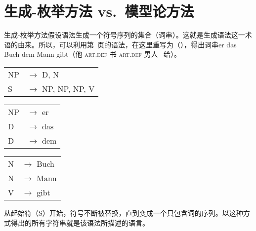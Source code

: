 
\chapter{生成-枚举方法 vs.\ 模型论方法}
\label{Abschnitt-Generativ-Modelltheoretisch}

生成-枚举方法假设语法生成一个符号序列的集合（词串）。这就是生成语法这一术语的由来。所以，可以利用第~\pageref{bsp-grammatik-psg}页的语法，在这里重写为（），得出词串er das Buch dem Mann gibt（他 \textsc{art}.\textsc{def} 书 \textsc{art}.\textsc{def} 男人 \, 给）。
\ea
\label{bsp-grammatik-psg-zwei}
\begin{tabular}[t]{@{}l@{ }l}
{NP} & {$\to$ D, N}\\          
{S}  & {$\to$ NP, NP, NP, V}
\end{tabular}\hspace{2cm}%
\begin{tabular}[t]{@{}l@{ }l}
{NP} & {$\to$ er}\\
{D}  & {$\to$ das}\\
{D}  & {$\to$ dem}\\
\end{tabular}\hspace{8mm}
\begin{tabular}[t]{@{}l@{ }l}
{N} & {$\to$ Buch}\\
{N} & {$\to$ Mann}\\
{V} & {$\to$ gibt}\\
\end{tabular}
\z
从起始符（S）开始，符号不断被替换，直到变成一个只包含词的序列。以这种方式得出的所有字符串就是该语法所描述的语言。

